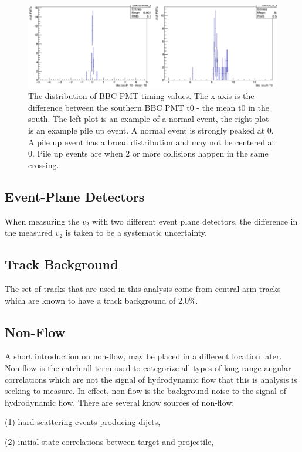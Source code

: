 \begin{figure}[!h]
\begin{center}
\includegraphics[width=0.8\linewidth]{figs/example_pile_up_event.png}
\caption{The distribution of BBC PMT timing values. The x-axis is the difference between the southern BBC PMT t0 - the mean t0 in the south. The left plot is an example of a normal event, the right plot is an example pile up event. A normal event is strongly peaked at 0. A pile up event has a broad distribution and may not be centered at 0. Pile up events are when 2 or more collisions happen in the same crossing.}
\label{fig:pile_up_example}
\end{center}
\end{figure}

\subsection{Event-Plane Detectors}
When measuring the $v_2$ with two different event plane detectors, the difference in the measured $v_2$ is taken to be a systematic uncertainty. 
\subsection{Track Background}
The set of tracks that are used in this analysis come from central arm tracks which are known to have a track background of 2.0\%.
\subsection{Non-Flow}
A short introduction on non-flow, may be placed in a different location later.
Non-flow is the catch all term used to categorize all types of long range angular correlations which are not the signal of hydrodynamic flow that this is analysis is seeking to measure. In effect, non-flow is the background noise to the signal of hydrodynamic flow. There are several know sources of non-flow:

(1) hard scattering events producing dijets,

(2) initial state correlations between target and projectile,

